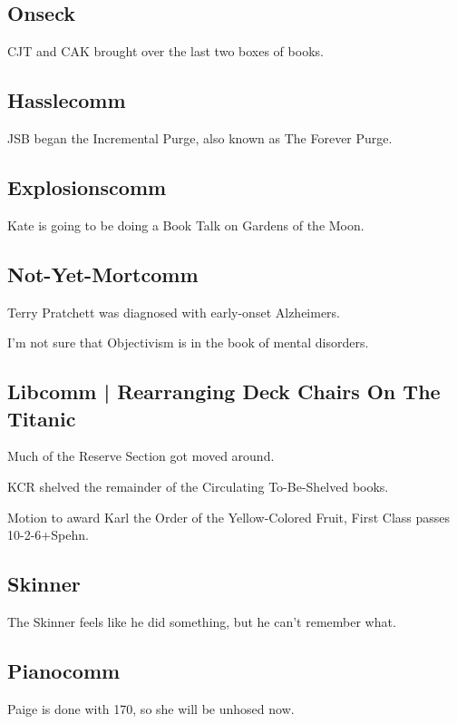 \documentclass[10pt]{article}
\begin{document}
\subsection*{Onseck}

CJT and CAK brought over the last two boxes of books. 

\subsection*{Hasslecomm}

JSB began the Incremental Purge, also known as The Forever Purge.

\subsection*{Explosionscomm}

Kate is going to be doing a Book Talk on Gardens of the Moon.

\subsection*{Not-Yet-Mortcomm}

Terry Pratchett was diagnosed with early-onset Alzheimers.

I'm not sure that Objectivism is in the book of mental disorders.

\subsection*{Libcomm | Rearranging Deck Chairs On The Titanic}

Much of the Reserve Section got moved around.

KCR shelved the remainder of the Circulating To-Be-Shelved books.

Motion to award Karl the Order of the Yellow-Colored Fruit, First Class passes 10-2-6+Spehn.

\subsection*{Skinner}

The Skinner feels like he did something, but he can't remember what.

\subsection*{Pianocomm}

Paige is done with 170, so she will be unhosed now.
\end{document}
